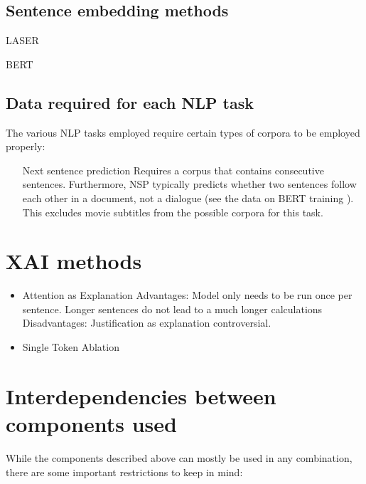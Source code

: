 \subsection{Sentence embedding methods}

\begin{description}
	\item[LASER] \cite{artetxeMassivelyMultilingualSentence2019}
	\item[BERT] \cite{reimersMakingMonolingualSentence2020}
\end{description}

\subsection{Data required for each NLP task}
The various NLP tasks employed require certain types of corpora to be employed properly:

\begin{itemize}
	\item[Next sentence prediction]
	      Requires a corpus that contains consecutive sentences.
	      Furthermore, NSP typically predicts whether two sentences follow each other in a document, not a dialogue (see the data on BERT training \cite{kentonBertPretrainingDeep2019}).
	      This excludes movie subtitles from the possible corpora for this task.

\end{itemize}

\section{XAI methods}
\begin{itemize}
	\item Attention as Explanation
	      Advantages:
	      Model only needs to be run once per sentence.
	      Longer sentences do not lead to a much longer calculations
	      Disadvantages: Justification as explanation controversial.
	\item Single Token Ablation
\end{itemize}

\section{Interdependencies between components used}

While the components described above can mostly be used in any combination, there are some important restrictions to keep in mind:

